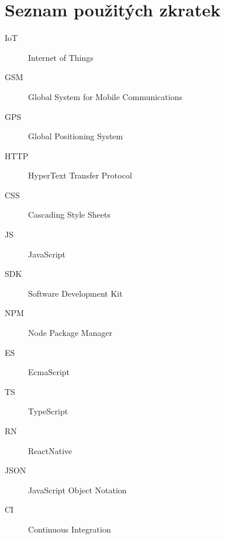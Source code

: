 \chapter*{Seznam použitých zkratek}

\begin{multicols}{2}
\raggedright
\begin{description}
\item [IoT] Internet of Things
\item [GSM] Global System for Mobile Communications
\item [GPS] Global Positioning System
\item [HTTP] HyperText Transfer Protocol
\item[CSS] Cascading Style Sheets
\item [JS] JavaScript
\item [SDK] Software Development Kit
\item [NPM] Node Package Manager
\item [ES] EcmaScript
\item [TS] TypeScript
\item [RN] ReactNative
\item [JSON] JavaScript Object Notation
\item [CI] Continuous Integration
\end{description}
\end{multicols}

